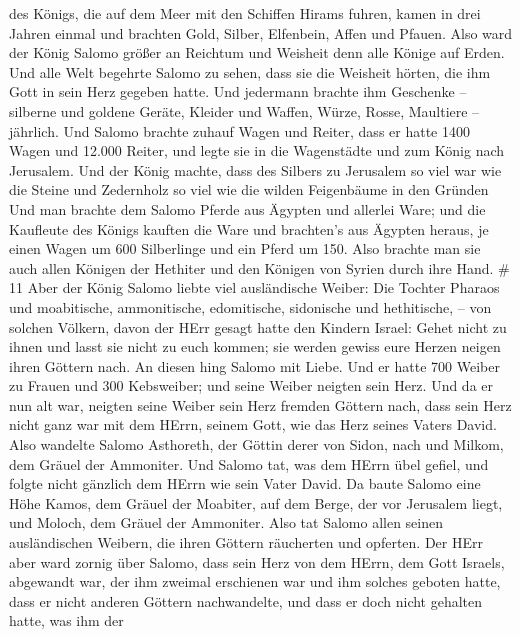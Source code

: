 des Königs, die auf dem Meer mit den Schiffen Hirams fuhren, kamen in
drei Jahren einmal und brachten Gold, Silber, Elfenbein, Affen und
Pfauen.  Also ward der König Salomo größer an Reichtum und
Weisheit denn alle Könige auf Erden.  Und alle Welt
begehrte Salomo zu sehen, dass sie die Weisheit hörten, die ihm Gott in
sein Herz gegeben hatte.  Und jedermann brachte ihm
Geschenke -- silberne und goldene Geräte, Kleider und Waffen, Würze,
Rosse, Maultiere -- jährlich.  Und Salomo brachte zuhauf
Wagen und Reiter, dass er hatte 1400 Wagen und 12.000 Reiter, und legte
sie in die Wagenstädte und zum König nach Jerusalem.  Und
der König machte, dass des Silbers zu Jerusalem so viel war wie die
Steine und Zedernholz so viel wie die wilden Feigenbäume in den Gründen
 Und man brachte dem Salomo Pferde aus Ägypten und allerlei
Ware; und die Kaufleute des Königs kauften die Ware  und
brachten's aus Ägypten heraus, je einen Wagen um 600 Silberlinge und ein
Pferd um 150. Also brachte man sie auch allen Königen der Hethiter und
den Königen von Syrien durch ihre Hand. \# 11  Aber der
König Salomo liebte viel ausländische Weiber: Die Tochter Pharaos und
moabitische, ammonitische, edomitische, sidonische und hethitische, --
 von solchen Völkern, davon der HErr gesagt hatte den
Kindern Israel: Gehet nicht zu ihnen und lasst sie nicht zu euch kommen;
sie werden gewiss eure Herzen neigen ihren Göttern nach. An diesen hing
Salomo mit Liebe.  Und er hatte 700 Weiber zu Frauen und 300
Kebsweiber; und seine Weiber neigten sein Herz.  Und da er
nun alt war, neigten seine Weiber sein Herz fremden Göttern nach, dass
sein Herz nicht ganz war mit dem HErrn, seinem Gott, wie das Herz seines
Vaters David.  Also wandelte Salomo Asthoreth, der Göttin
derer von Sidon, nach und Milkom, dem Gräuel der Ammoniter. 
Und Salomo tat, was dem HErrn übel gefiel, und folgte nicht gänzlich dem
HErrn wie sein Vater David.  Da baute Salomo eine Höhe
Kamos, dem Gräuel der Moabiter, auf dem Berge, der vor Jerusalem liegt,
und Moloch, dem Gräuel der Ammoniter.  Also tat Salomo allen
seinen ausländischen Weibern, die ihren Göttern räucherten und opferten.
 Der HErr aber ward zornig über Salomo, dass sein Herz von
dem HErrn, dem Gott Israels, abgewandt war, der ihm zweimal erschienen
war  und ihm solches geboten hatte, dass er nicht anderen
Göttern nachwandelte, und dass er doch nicht gehalten hatte, was ihm der
